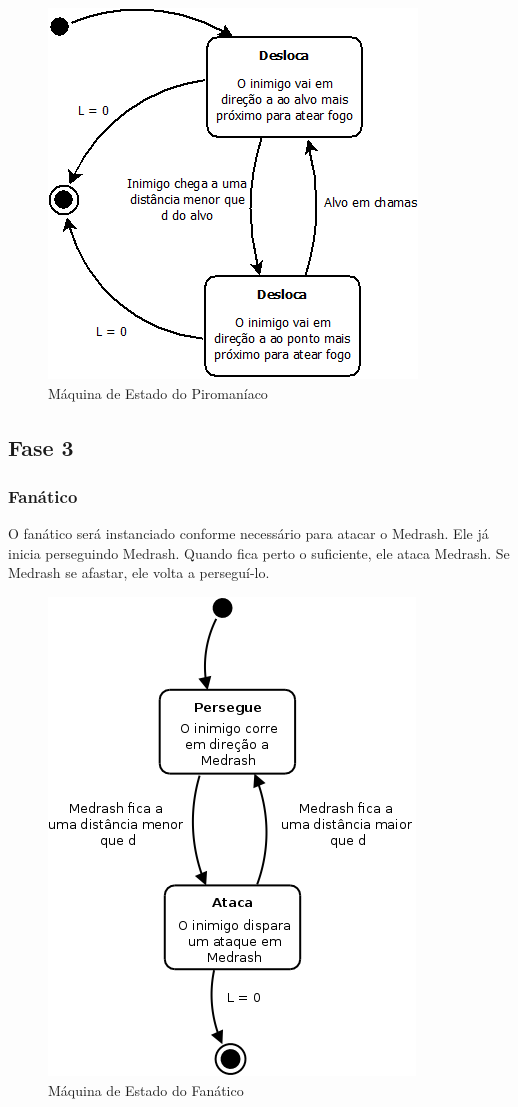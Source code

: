 \begin{figure}[!ht]
 \centering
 \includegraphics[scale=0.5]{ia_piromaniaco.png}
 \caption{Máquina de Estado do Piromaníaco}
 \label{fsm:piromaniaco}
\end{figure}

\subsection{Fase 3}

\subsubsection{Fanático}

O fanático será instanciado conforme necessário para atacar o Medrash.
Ele já inicia perseguindo Medrash. Quando fica perto o suficiente, ele
ataca Medrash. Se Medrash se afastar, ele volta a perseguí-lo.

\begin{figure}[!ht]
 \centering
 \includegraphics[scale=0.5]{ia_fanatico.png}
 \caption{Máquina de Estado do Fanático}
 \label{fsm:fanatico}
\end{figure}

